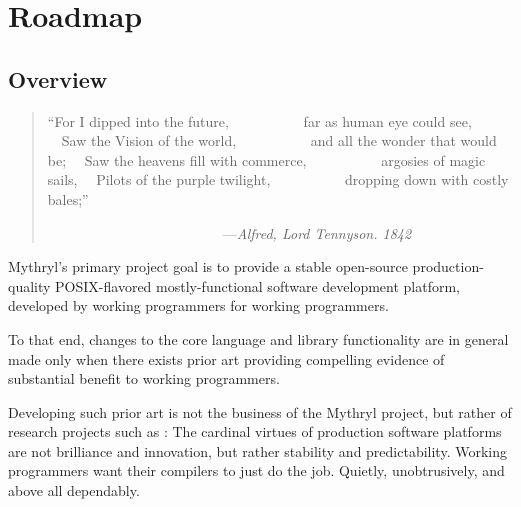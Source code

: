 \chapter{Roadmap}

%
%

\section{Overview}

\begin{quote}\begin{tiny}
           ``For I dipped into the future,\newline
            ~~~~~~~~~~far as human eye could see,\newline
            ~~Saw the Vision of the world,\newline
            ~~~~~~~~~~and all the wonder that would be;\newline
            ~~Saw the heavens fill with commerce,\newline
            ~~~~~~~~~~argosies of magic sails,\newline
            ~~Pilots of the purple twilight,\newline
            ~~~~~~~~~~dropping down with costly bales;''\newline

            ~~~~~~~~~~~~~~~~~~~~~~~~~---{\em Alfred, Lord Tennyson. 1842}
\end{tiny}\end{quote}

Mythryl's primary project goal is to provide a stable 
open-source production-quality {\sc POSIX}-flavored mostly-functional 
software development platform, developed by working programmers for 
working programmers.

To that end, changes to the core language and library functionality 
are in general made only when there exists prior art providing 
compelling evidence of substantial benefit to working programmers.

Developing such prior art is not the business of the Mythryl project, 
but rather of research projects such as : 
The cardinal virtues of production 
software platforms are not brilliance and innovation, but rather 
stability and predictability.  Working programmers want their compilers 
to just do the job.  Quietly, unobtrusively, and above all dependably.

